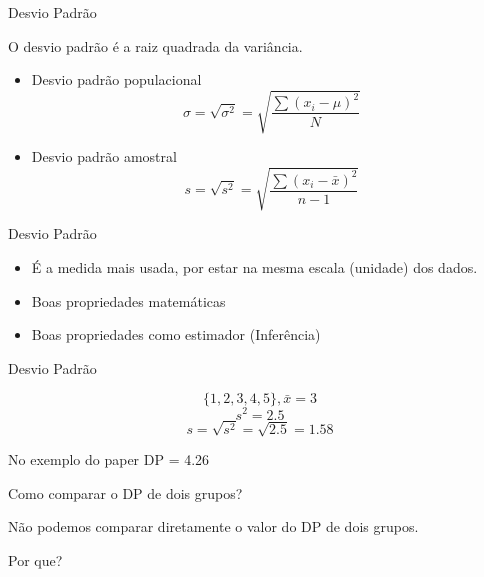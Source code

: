 \documentclass{beamer}
\begin{document}
\begin{frame}{Desvio Padrão}
  \begin{definition}
    O desvio padrão é a raiz quadrada da variância.
  \end{definition}
  \begin{itemize}
  \item Desvio padrão populacional
    $$ \sigma = \sqrt{ \sigma^2 } = \sqrt{ \frac{\sum (x_i - \mu)^2}{N} } $$
  \item Desvio padrão amostral
    $$ s = \sqrt{s^2 } = \sqrt{ \frac{\sum (x_i - \bar{x})^2}{n-1} } $$
  \end{itemize}
\end{frame}

\begin{frame}{Desvio Padrão}
  \begin{itemize}
  \item É a medida mais usada, por estar na mesma escala (unidade) dos
    dados.
  \item Boas propriedades matemáticas
  \item Boas propriedades como estimador (Inferência)
  \end{itemize}
\end{frame}

\begin{frame}{Desvio Padrão}
  \begin{example}
      \begin{displaymath}
    \{1,2,3,4,5\}, \bar{x} = 3
  \end{displaymath}
      \begin{displaymath}
        s^2 = 2.5
      \end{displaymath}
    \begin{displaymath}
        s = \sqrt{s^2} = \sqrt{2.5} = 1.58
    \end{displaymath}
  \end{example}
  \begin{block}{No exemplo do paper}
    DP = 4.26
  \end{block}
\end{frame}

\begin{frame}{Como comparar o DP de dois grupos?}
  \begin{block}{}
    Não podemos comparar diretamente o \alert{valor} do DP de dois grupos.

    \bigskip
    Por que?
  \end{block}
\end{frame}
\end{document}

